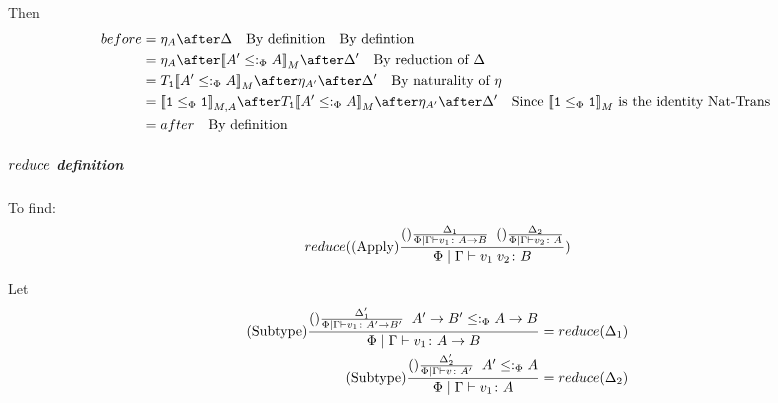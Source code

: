 \documentclass{report}
\begin{document}
                Then
                \begin{align}
                    before &= \point{A}\after\D\qt{By definition}\qt{By defintion}\\
                    &{}= \point{A}\after\deno{A'\subtypep A}\after \D'\qt{By reduction of $\D$}\\
                    &{}=\T{\1}{\deno{A'\subtypep A}}\after \point{A'}\after\D'\qt{By naturality of $\point{}$}\\
                    &{}=\db{\1\subeffectp\1}_{M, A} \after \T{\1}{\deno{A'\subtypep A}}\after\point{A'}\after\D'\qt{Since $\deno{\1\subeffectp\1}$ is the identity Nat-Trans }\\
                    &{}=after\qt{By definition}\\
                \end{align}
            \subparagraph{$reduce$ definition}
            To find:
            \begin{equation}
                reduce((\text{Apply}) \frac{
                    (\text{}) \frac{\Delta_1}{
                        \Phi\mid\Gamma \vdash v_1 \colon A\rightarrow B
                    }
                    \;\;
                    (\text{}) \frac{\Delta_2}{
                        \Phi\mid\Gamma \vdash v_2 \colon A
                    }
                }{
                    \Phi\mid\Gamma \vdash v_1\; v_2 \colon B
                })
            \end{equation}

            Let
            \begin{align}
                (\text{Subtype}) \frac{
                    (\text{}) \frac{\Delta'_1}{\Phi\mid\Gamma \vdash v_1 \colon A'\rightarrow B'}
                    \;\;
                    A'\rightarrow B'\leq:_\Phi A\rightarrow B
                }{
                    \Phi\mid\Gamma \vdash v_1 \colon A\rightarrow B
                } & = reduce(\Delta_1)\\
                (\text{Subtype}) \frac{
                    (\text{}) \frac{\Delta'_2}{\Phi\mid\Gamma \vdash v \colon A'}
                    \;\;
                    A'\leq:_\Phi A
                }{
                    \Phi\mid\Gamma \vdash v_1 \colon A
                } & = reduce(\Delta_2)
            \end{align}
\end{document}
